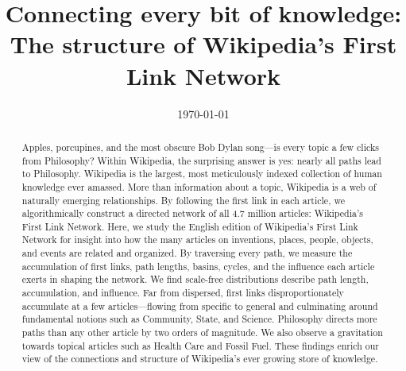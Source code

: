 \documentclass[pre,twocolumn,twoside,superscriptaddress,floatfix, aps, 10pt]{revtex4-1}
\begin{document}
\title{\protect
Connecting every bit of knowledge: \\
The structure of Wikipedia's First Link Network
}

\date{\today}

\author{
}


\author{
}


\author{
}



\begin{abstract}
  \protect
Apples, porcupines, and the most obscure Bob Dylan song---is every topic a few clicks from Philosophy? 
Within Wikipedia, the surprising answer is yes: nearly all 
paths lead to Philosophy.
Wikipedia is the largest, most meticulously indexed collection of human knowledge ever amassed. 
More than information about a topic, Wikipedia is a web of naturally emerging relationships.  
By following the first link in each article, we algorithmically construct a directed network of 
all 4.7 million articles: Wikipedia's First Link Network.
Here, we study the English edition of Wikipedia's First Link Network for insight into how the many 
articles on inventions, places, people, objects, and events are related and organized.  
By traversing every path, we measure the accumulation of first links, path lengths, basins, cycles, 
and the influence each article exerts in shaping the network.
We find scale-free distributions describe path length, 
accumulation, and influence. Far from dispersed, first links disproportionately accumulate 
at a few articles---flowing from specific to general and culminating around fundamental notions such as
Community, State, and Science. 
Philosophy directs more paths than any other article by two orders of magnitude. 
We also observe a gravitation towards topical articles such as 
Health Care and Fossil Fuel. 
These findings enrich our view of the connections and structure of
Wikipedia's ever growing store of knowledge.

\end{abstract}
\end{document}
